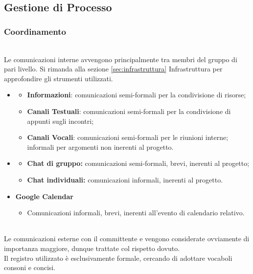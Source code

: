 \subsection{Gestione di Processo}
\subsubsection{Coordinamento} \label{sec:coordinamento}
\\
Le comunicazioni interne avvengono principalmente tra membri del gruppo di pari livello. Si rimanda alla sezione \ref{sec:infrastruttura} Infrastruttura per approfondire gli strumenti utilizzati.
\begin{itemize}
  \item{\textbf{}}
  \begin{itemize}
    \item \textbf{Informazioni}: comunicazioni semi-formali per la condivisione di risorse;
    \item \textbf{Canali Testuali}: comunicazioni semi-formali per la condivisione di appunti sugli
        incontri;
    \item \textbf{Canali Vocali}: comunicazioni semi-formali per le riunioni interne; informali per argomenti non inerenti al progetto.
  \end{itemize}
  \item{\textbf{}}
  \begin{itemize}
    \item \textbf{Chat di gruppo:} comunicazioni semi-formali, brevi, inerenti al progetto;
    \item \textbf{Chat individuali:} comunicazioni informali, inerenti al progetto.
  \end{itemize}
  \item{\textbf{Google Calendar}}
  \begin{itemize}
    \item{Comunicazioni informali, brevi, inerenti all'evento di calendario relativo.}
  \end{itemize}
\end{itemize}
\\
Le comunicazioni esterne con il committente e  vengono considerate ovviamente di importanza maggiore, dunque trattate col rispetto dovuto.\\
Il registro utilizzato è esclusivamente formale, cercando di adottare vocaboli consoni e concisi.
